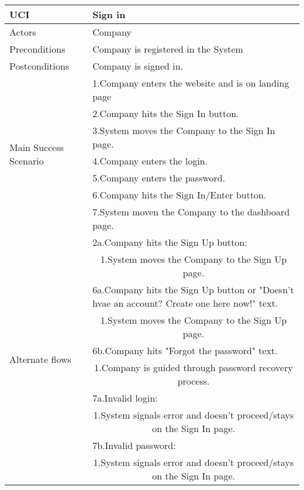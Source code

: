 	\begin{table}[H]
	\centering
	\sffamily\captionsetup{justification=raggedright,singlelinecheck=false,position = below, font = sf}
	\begin{tabular}{|m{3.5cm}|m{11cm}|}
	\hline
	UCI & Sign in \\
	\hline
	Actors & Company \\
	\hline
	Preconditions & Company is registered in the System  \\
	\hline
	Postconditions & Company is signed in. \\
	\hline
	\multirow{7}{*}{Main Success Scenario} & 1.Company enters the website and is on landing page \\
    \cline{2-2}
     & 2.Company hits the Sign In button. \\
	\cline{2-2}
     & 3.System moves the Company to the Sign In page.\\
	\cline{2-2}
     & 4.Company enters the login. \\
	\cline{2-2}
     & 5.Company enters the password. \\
	\cline{2-2}
     & 6.Company hits the Sign In/Enter button. \\
	\cline{2-2}
     & 7.System moven the Company to the dashboard page. \\
    \hline
    \multirow{10}{*}{Alternate flows} & 2a.Company hits the Sign Up button: \\
	\cline{2-2}
	& \multicolumn{1}{c|}{1.System moves the Company to the Sign Up page.} \\
	\cline{2-2}
	& 6a.Company hits the Sign Up button or "Doesn't hvae an account? Create one here now!" text. \\
	\cline{2-2}
	& \multicolumn{1}{c|}{1.System moves the Company to the Sign Up page.}	 \\
	\cline{2-2}
	& 6b.Company hits "Forgot the password" text. \\
	\cline{2-2}
	& \multicolumn{1}{c|}{1.Company is guided through password recovery process.} \\
	\cline{2-2}
	& 7a.Invalid login: \\
	\cline{2-2}
	& \multicolumn{1}{c|}{1.System signals error and doesn't proceed/stays on the Sign In page.}	 \\
	\cline{2-2}
	& 7b.Invalid password: \\
	\cline{2-2}
	& \multicolumn{1}{c|}{1.System signals error and doesn't proceed/stays on the Sign In page.} \\
    \hline
	\end{tabular}
	\end{table}
	
